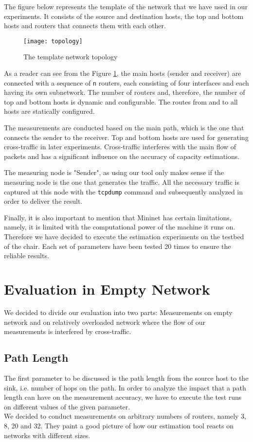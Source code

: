 The figure below represents the template of the network that we have used in our experiments. It consists of the source and destination hosts, the top and bottom hosts and routers that connects them with each other. \\

\begin{figure}[htp]
 \centering
	 \texttt{[image: topology]}
 \caption{The template network topology}
 \label{topology}

\end{figure}

As a reader can see from the Figure \ref{topology}, the main hosts (sender and receiver) are connected with a sequence of \texttt{n} routers, each consisting of four interfaces and each having its own subnetwork. The number of routers and, therefore, the number of top and bottom hosts is dynamic and configurable. The routes from and to all hosts are statically configured.

The measurements are conducted based on the main path, which is the one that connects the sender to the receiver. Top and bottom hosts are used for generating cross-traffic in later experiments. Cross-traffic interferes with the main flow of packets and has a significant influence on the accuracy of capacity estimations.  

The measuring node is "Sender", as using our tool only makes sense if the measuring node is the one that generates the traffic. All the necessary traffic is captured at this node with the \texttt{tcpdump} command and subsequently analyzed in order to deliver the result.

Finally, it is also important to mention that Mininet has certain limitations, namely, it is limited with the computational power of the machine it runs on. Therefore we have decided to execute the estimation experiments on the testbed of the chair.
Each set of parameters have been tested 20 times to ensure the reliable results.

\section{Evaluation in Empty Network}
We decided to divide our evaluation into two parts: Measurements on empty network and on relatively overloaded network where the flow of our measurements is interfered by cross-traffic. 

\subsection{Path Length}
The first parameter to be discussed is the path length from the source host to the sink, i.e. number of hops on the path. In order to analyze the impact that a path length can have on the measurement accuracy, we have to execute the test runs on different values of the given parameter. \\
We decided to conduct measurements on arbitrary numbers of routers, namely 3, 8, 20 and 32. They paint a good picture of how our estimation tool reacts on networks with different sizes. 

